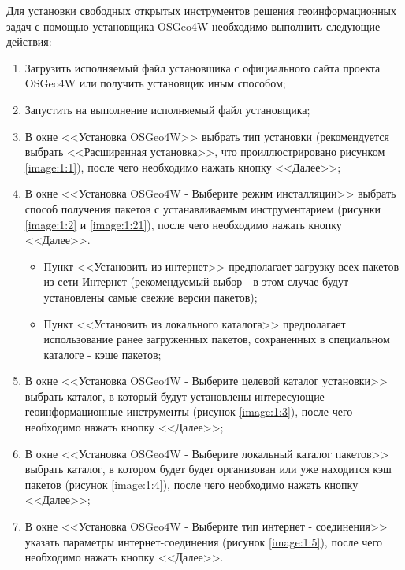 
Для установки свободных открытых инструментов решения геоинформационных задач с помощью установщика OSGeo4W необходимо выполнить следующие действия:

\begin{enumerate}

	\item Загрузить исполняемый файл установщика с официального сайта проекта OSGeo4W \cite{osgeo4w} или получить установщик иным способом;
	\item Запустить на выполнение исполняемый файл установщика;
	\item В окне <<Установка OSGeo4W>> выбрать тип установки (рекомендуется выбрать <<Расширенная установка>>, что проиллюстрировано рисунком \ref{image:1:1}), после чего необходимо нажать кнопку <<Далее>>;
	\item В окне <<Установка OSGeo4W - Выберите режим инсталляции>> выбрать способ получения пакетов с устанавливаемым инструментарием (рисунки \ref{image:1:2} и \ref{image:1:21}), после чего необходимо нажать кнопку <<Далее>>.

	\begin{itemize}

		\item Пункт <<Установить из интернет>> предполагает загрузку всех пакетов из сети Интернет (рекомендуемый выбор - в этом случае будут установлены самые свежие версии пакетов);
		\item Пункт <<Установить из локального каталога>> предполагает использование ранее загруженных пакетов, сохраненных в специальном каталоге - кэше пакетов;

	\end{itemize}

	\item В окне <<Установка OSGeo4W - Выберите целевой каталог установки>> выбрать каталог, в который будут установлены интересующие геоинформационные инструменты (рисунок \ref{image:1:3}), после чего необходимо нажать кнопку <<Далее>>;
	\item В окне <<Установка OSGeo4W - Выберите локальный каталог пакетов>> выбрать каталог, в котором будет будет организован или уже находится кэш пакетов (рисунок \ref{image:1:4}), после чего необходимо нажать кнопку <<Далее>>;
	\item В окне <<Установка OSGeo4W - Выберите тип интернет - соединения>> указать параметры интернет-соединения (рисунок \ref{image:1:5}), после чего необходимо нажать кнопку <<Далее>>.


\end{enumerate}
